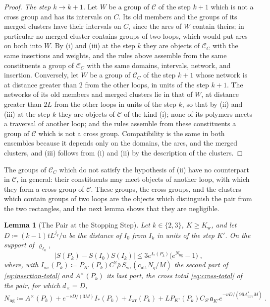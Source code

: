 \documentclass[11pt]{preprint}
\numberwithin{equation}{section}
\newtheorem{lemma}[theorem]{Lemma}
\theoremstyle{definition}
\theoremstyle{remark}
\theoremstyle{plain}
\begin{document}
\begin{proof}
\emph{The step $k \to k + 1$.} Let $W$ be a group of $\mathcal C$ of the step $k + 1$ which is not a cross group and has its intervals on $C$. Its old members and the groups of its merged clusters have their intervals on $C$, since the arcs of $W$ contain theirs; in particular no merged cluster contains groups of two loops, which would put arcs on both into $W$. By (i) and (iii) at the step $k$ they are objects of $\mathcal C_C$ with the same insertions and weights, and the rules above assemble from the same constituents a group of $\mathcal C_C$ with the same domains, intervals, network, and insertion. Conversely, let $W$ be a group of $\mathcal C_C$ of the step $k + 1$ whose network is at distance greater than $2$ from the other loops, in units of the step $k + 1$. The networks of its old members and merged clusters lie in that of $W$, at distance greater than $2L$ from the other loops in units of the step $k$, so that by (ii) and (iii) at the step $k$ they are objects of $\mathcal C$ of the kind (i); none of its polymers meets a traversal of another loop; and the rules assemble from these constituents a group of $\mathcal C$ which is not a cross group. Compatibility is the same in both ensembles because it depends only on the domains, the arcs, and the merged clusters, and (iii) follows from (i) and (ii) by the description of the clusters.
\end{proof}

The groups of $\mathcal C_C$ which do not satisfy the hypothesis of (ii) have no counterpart in $\mathcal C$, in general: their constituents may meet objects of another loop, with which they form a cross group of $\mathcal C$. These groups, the cross groups, and the clusters which contain groups of two loops are the objects which distinguish the pair from the two rectangles, and the next lemma shows that they are negligible.

\begin{lemma}[The Pair at the Stopping Step]\label{lem:pair-stopping}
Let $k \in \{ 2, 3 \}$, $K \geq K_{\mathrm w}$, and let $D \coloneqq (k - 1)tL^{j_q}/u$ be the distance of $I_0$ from $I_k$ in units of the step $K'$. On the support of $\varrho_{\ell_0}$,
\begin{equation}\label{eq:pair-stopping}
    \bigl\lvert S(P_k) - S(I_0)S(I_k)\bigr\rvert \leq 3e^{I_*(P_k)}\bigl(e^{N_{\mathrm{ng}}} - 1\bigr)\;,
\end{equation}
where, with $I_{\mathrm{wr}}(P_k) \coloneqq P_{K'}(P_k)C^2\bar\rho\,S_{\mathrm{wr}}(c_{\mathrm{att}}N_q/M)$ the second part of \eqref{eq:insertion-total} and $A^\times(P_k)$ its last part, the cross total \eqref{eq:cross-total} of the pair, for which $d_\times = D$,
\begin{equation}\label{eq:near-mass}
    N_{\mathrm{ng}} \coloneqq A^\times(P_k) + e^{-\nu D/(3M)}I_*(P_k) + I_{\mathrm{wr}}(P_k) + LP_{K'}(P_k)C_{S'}\mathfrak a_{K'}e^{-\nu D/(96A^*_{\mathrm{env}}M)}\;.
\end{equation}
\end{lemma}
\end{document}
